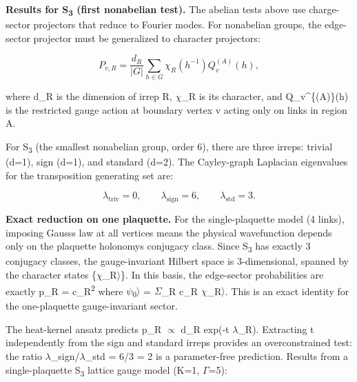 \textbf{Results for S\textsubscript{3} (first nonabelian test).} The abelian tests above use charge-sector projectors that reduce to Fourier modes. For nonabelian groups, the edge-sector projector must be generalized to character projectors:

\[
P_{v,R} = \frac{d_R}{|G|} \sum_{h \in G} \chi_R(h^{-1}) Q_v^{(A)}(h),
\]

where d\_R is the dimension of irrep R, \ensuremath{\chi}\_R is its character, and Q\_v\^{}\{(A)\}(h) is the restricted gauge action at boundary vertex v acting only on links in region A.

For S\textsubscript{3} (the smallest nonabelian group, order 6), there are three irreps: trivial (d=1), sign (d=1), and standard (d=2). The Cayley-graph Laplacian eigenvalues for the transposition generating set are:

\[
\lambda_{\mathrm{triv}} = 0, \qquad \lambda_{\mathrm{sign}} = 6, \qquad
\lambda_{\mathrm{std}} = 3.
\]

\textbf{Exact reduction on one plaquette.} For the single-plaquette model (4 links), imposing Gauss\textquotesingle s law at all vertices means the physical wavefunction depends only on the plaquette holonomy\textquotesingle s conjugacy class. Since S\textsubscript{3} has exactly 3 conjugacy classes, the gauge-invariant Hilbert space is 3-dimensional, spanned by the character states \{\textbar \ensuremath{\chi}\_R\ensuremath{\rangle}\}. In this basis, the edge-sector probabilities are exactly p\_R = \textbar c\_R\textbar\textsuperscript{2} where \textbar \ensuremath{\psi}\textsubscript{0}\ensuremath{\rangle} = \ensuremath{\Sigma}\_R c\_R \textbar \ensuremath{\chi}\_R\ensuremath{\rangle}. This is an exact identity for the one-plaquette gauge-invariant sector.

The heat-kernel ansatz predicts p\_R \ensuremath{\propto} d\_R exp(-t \ensuremath{\lambda}\_R). Extracting t independently from the sign and standard irreps provides an overconstrained test: the ratio \ensuremath{\lambda}\_sign/\ensuremath{\lambda}\_std = 6/3 = 2 is a parameter-free prediction. Results from a single-plaquette S\textsubscript{3} lattice gauge model (K=1, \ensuremath{\Gamma}=5):

